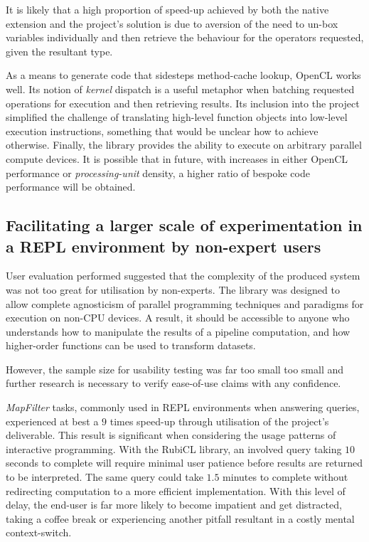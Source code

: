 It is likely that a high proportion of speed-up achieved by both the native extension and the project's solution is due to aversion of the need to un-box variables individually and then retrieve the behaviour for the operators requested, given the resultant type.

As a means to generate code that sidesteps method-cache lookup, \ac{OpenCL} works well. Its notion of \emph{kernel} dispatch is a useful metaphor when batching requested operations for execution and then retrieving results. Its inclusion into the project simplified the challenge of translating high-level function objects into low-level execution instructions, something that would be unclear how to achieve otherwise. Finally, the library provides the ability to execute on arbitrary parallel compute devices. It is possible that in future, with increases in either \ac{OpenCL} performance or \emph{processing-unit} density, a higher ratio of bespoke code performance will be obtained.
\subsection{Facilitating a larger scale of experimentation in a REPL environment by non-expert users}
User evaluation performed suggested that the complexity of the produced system was not too great for utilisation by non-experts. The library was designed to allow complete agnosticism of parallel programming techniques and paradigms for execution on non-\ac{CPU} devices. A result, it should be accessible to anyone who understands how to manipulate the results of a pipeline computation, and how higher-order functions can be used to transform datasets.

However, the sample size for usability testing was far too small too small and further research is necessary to verify ease-of-use claims with any confidence.

\emph{MapFilter} tasks, commonly used in \ac{REPL} environments when answering queries, experienced at best a $9$ times speed-up through utilisation of the project's deliverable. This result is significant when considering the usage patterns of interactive programming. With the RubiCL library, an involved query taking $10$ seconds to complete will require minimal user patience before results are returned to be interpreted. The same query could take $1.5$ minutes to complete without redirecting computation to a more efficient implementation. With this level of delay, the end-user is far more likely to become impatient and get distracted, taking a coffee break or experiencing another pitfall resultant in a costly mental context-switch.

